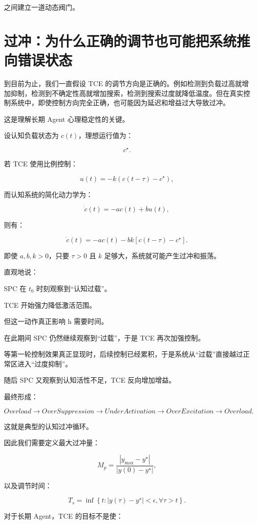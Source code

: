 之间建立一道动态阀门。

\section{过冲：为什么正确的调节也可能把系统推向错误状态}

到目前为止，我们一直假设 TCE 的调节方向是正确的。例如检测到负载过高就增加抑制，检测到不确定性高就增加搜索，检测到搜索过度就降低温度。但在真实控制系统中，即使控制方向完全正确，也可能因为延迟和增益过大导致过冲。

这是理解长期 Agent 心理稳定性的关键。

设认知负载状态为 $c(t)$，理想运行值为：

\[
c^\star.
\]

若 TCE 使用比例控制：

\[
u(t)
=
-k(c(t-\tau)-c^\star),
\]

而认知系统的简化动力学为：

\[
\dot c(t)
=
-ac(t)+bu(t),
\]

则有：

\[
\dot c(t)
=
-ac(t)
-
bk
\left[
c(t-\tau)-c^\star
\right].
\]

即使 $a,b,k>0$，只要 $\tau>0$ 且 $k$ 足够大，系统就可能产生过冲和振荡。

直观地说：

SPC 在 $t_0$ 时刻观察到“认知过载”。

TCE 开始强力降低激活范围。

但这一动作真正影响 h 需要时间。

在此期间 SPC 仍然继续观察到“过载”，于是 TCE 再次加强控制。

等第一轮控制效果真正显现时，后续控制已经累积，于是系统从“过载”直接越过正常区进入“过度抑制”。

随后 SPC 又观察到认知活性不足，TCE 反向增加增益。

最终形成：

\[
Overload
\rightarrow
OverSuppression
\rightarrow
UnderActivation
\rightarrow
OverExcitation
\rightarrow
Overload.
\]

这就是典型的认知过冲循环。

因此我们需要定义最大过冲量：

\[
M_p
=
\frac{
|y_{\max}-y^\star|
}{
|y(0)-y^\star|
},
\]

以及调节时间：

\[
T_s
=
\inf
\left\{
t:
|y(\tau)-y^\star|<\epsilon,
\forall\tau>t
\right\}.
\]

对于长期 Agent，TCE 的目标不是使：

